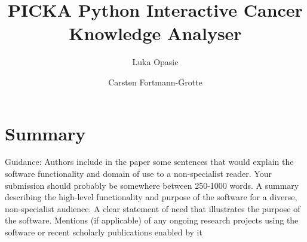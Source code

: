 \documentclass[11pt,a4paper]{article}
\begin{document}
\title{PICKA Python Interactive Cancer Knowledge Analyser}

\author[1]{Luka Opasic}
\author[1]{Carsten Fortmann-Grotte}


\date{}
\maketitle


\section{Summary}


Guidance:
Authors include in the paper some sentences that would explain the software functionality and domain of use to a non-specialist reader. Your submission should probably be somewhere between 250-1000 words. A summary describing the high-level functionality and purpose of the software for a diverse, non-specialist audience.
A clear statement of need that illustrates the purpose of the software. Mentions (if applicable) of any ongoing research projects using the software or recent scholarly publications enabled by it
\end{document}
